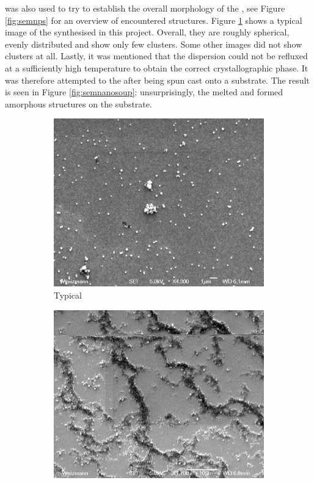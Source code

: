 \sem{} was also used to try to establish the overall morphology of the \nps{}, see Figure \ref{fig:semnps} for an overview of encountered structures. Figure \ref{fig:semtypnano} shows a typical \sem{} image of the \nps{} synthesised in this project. Overall, they are roughly spherical, evenly distributed and show only few clusters. Some other \sem{} images did not show clusters at all. Lastly, it was mentioned that the \np{} dispersion could not be refluxed at a sufficiently high temperature to obtain the correct crystallographic phase. It was therefore attempted to  the \nps{} after being spun cast onto a substrate. The result is seen in Figure \ref{fig:semnanosoup}: unsurprisingly, the \nps{} melted and formed amorphous structures on the substrate.
\begin{figure}
\begin{subfigure}{1\textwidth}
\centering
	\includegraphics[width=0.9\linewidth]{./figs/chap1/semTYPNANO}
	\caption{Typical \pvdf{} \nps}
	\label{fig:semtypnano}
\end{subfigure}
\vspace{30pt}
\begin{subfigure}{1\textwidth}
\centering
	\includegraphics[width=0.9\linewidth]{./figs/chap1/semNANOSOUP}

\end{subfigure}
\end{figure}
